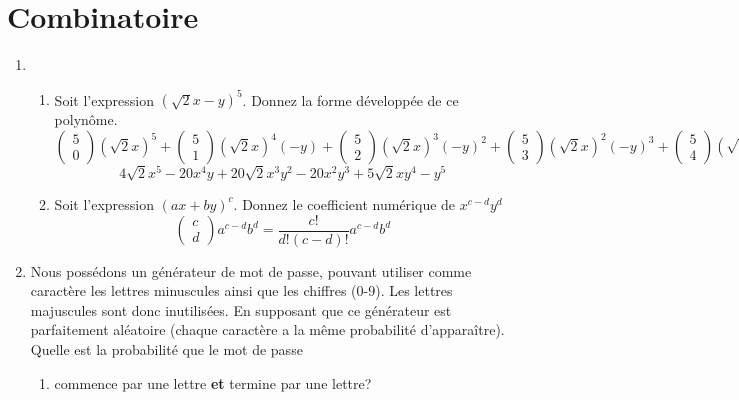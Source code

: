 \documentclass[A4paper,11pt]{article}
\begin{document}
\section{Combinatoire}
\begin{enumerate}
    \item \begin{enumerate}
        \item Soit l'expression $(\sqrt{2}x - y )^5$. Donnez la forme développée de ce polynôme.
        \[
        \begin{pmatrix}
        5 \\
        0
        \end{pmatrix}
        (\sqrt{2}x)^5+
        \begin{pmatrix}
        5 \\
        1
        \end{pmatrix}
        (\sqrt{2}x)^4(-y)+
        \begin{pmatrix}
        5 \\
        2
        \end{pmatrix}
        (\sqrt{2}x)^3(-y)^2+
        \begin{pmatrix}
        5 \\
        3
        \end{pmatrix}
        (\sqrt{2}x)^2(-y)^3+
        \begin{pmatrix}
        5 \\
        4
        \end{pmatrix}
        (\sqrt{2}x)(-y)^4+
                \begin{pmatrix}
        5 \\
        5
        \end{pmatrix}
        (-y)^5
        \]
        \[
        4\sqrt{2}x^5 - 20x^4y + 20\sqrt{2}x^3y^2 - 20x^2y^3 + 5\sqrt{2}xy^4 - y^5
        \]
        \item Soit l'expression $(ax + by)^c$. Donnez le coefficient numérique de $x^{c-d}y^d$
        \[
        \begin{pmatrix}
                c\\
                d
        \end{pmatrix}
        a^{c-d}
        b^d
        = 
        \frac{c!}{d!(c-d)!}a^{c-d}
        b^d
        \]
    \end{enumerate}
    \item Nous possédons un générateur de mot de passe, pouvant utiliser comme caractère les lettres minuscules ainsi que les chiffres (0-9). Les lettres majuscules sont donc inutilisées. En supposant que ce générateur est parfaitement aléatoire (chaque caractère a la même probabilité d'apparaître). Quelle est la probabilité que le mot de passe
    \begin{enumerate}
        \item  commence par une lettre \textbf{et} termine par une lettre?
        

\end{enumerate}
\end{enumerate}
\end{document}
